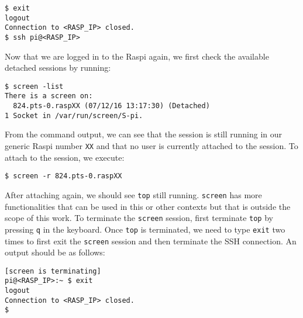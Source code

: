 \begin{lstlisting}[]
$ exit
logout
Connection to <RASP_IP> closed.
$ ssh pi@<RASP_IP>
\end{lstlisting}
\FloatBarrier
\vspace{-5mm}

Now that we are logged in to the \ac{Raspi} again, we first check the
available detached sessions by running:
\begin{lstlisting}[]
$ screen -list
There is a screen on:
  824.pts-0.raspXX (07/12/16 13:17:30) (Detached)
1 Socket in /var/run/screen/S-pi.
\end{lstlisting}
\FloatBarrier
\vspace{-5mm}

From the command output, we can see that the session is still running in our
generic \ac{Raspi} number \texttt{XX} and that no user is currently attached
to the session. To attach to the session, we execute:

\begin{lstlisting}[]
$ screen -r 824.pts-0.raspXX
\end{lstlisting}
\FloatBarrier
\vspace{-5mm}

After attaching again, we should see \texttt{top} still running.
\texttt{screen} has more functionalities that can be used in this
or other contexts but that is outside the scope of this work.
To terminate the \texttt{screen} session, first terminate \texttt{top}
by pressing \texttt{q} in the keyboard.
Once \texttt{top} is terminated,
we need to type \texttt{exit} two times to first exit the
\texttt{screen} session and then terminate the \ac{SSH} connection.
An output should be as follows:


\begin{lstlisting}[]
[screen is terminating]
pi@<RASP_IP>:~ $ exit
logout
Connection to <RASP_IP> closed.
$
\end{lstlisting}
\FloatBarrier
\vspace{-5mm}
